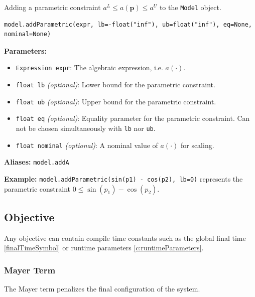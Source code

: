 \documentclass[12pt]{article}
\renewcommand{\v}{\bm}
\begin{document}
	\begin{mdframed}[backgroundcolor=gray!10, roundcorner=10pt, linewidth=1pt]
		
		Adding a parametric constraint ${a}^{L} \leq {a}(\v{p}) \leq {a}^{U}$ to the \texttt{Model} object.
		
		\begin{lstlisting}
model.addParametric(expr, lb=-float("inf"), ub=float("inf"), eq=None, nominal=None)
		\end{lstlisting}
		\label{addParametric}
		\textbf{Parameters:}
		\begin{itemize}
			\item \texttt{Expression expr}: The algebraic expression, i.e. $a(\cdot)$.
			\item \texttt{float lb} \emph{(optional)}: Lower bound for the parametric constraint.
			\item \texttt{float ub} \emph{(optional)}: Upper bound for the parametric constraint.
			\item \texttt{float eq} \emph{(optional)}: Equality parameter for the parametric constraint. Can not be chosen simultaneously with \texttt{lb} nor \texttt{ub}.
			\item \texttt{float nominal} \emph{(optional)}: A nominal value of $a(\cdot)$ for scaling.
		\end{itemize}
		
		\textbf{Aliases:}  \texttt{model.addA}
		
		\textbf{Example:} \texttt{model.addParametric(sin(p1) - cos(p2), lb=0)} represents the parametric constraint
		$0 \leq \sin(p_1) - \cos({p_2})$.
	\end{mdframed}
	
	\subsection{Objective}
	
	Any objective can contain compile time constants such as the global final time \ref{finalTimeSymbol} or runtime parameters \ref{c:runtimeParameters}.
	
	\subsubsection{Mayer Term}
		
	The Mayer term penalizes the final configuration of the system.
	
\end{document}
